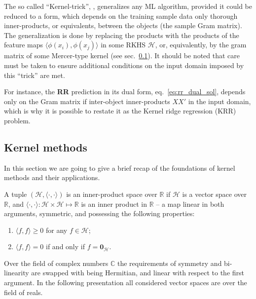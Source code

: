 \documentclass[a4paper,14pt]{extarticle}
\newcommand{\Hcal}{\mathcal{H}}
\newcommand{\Real}{\mathbb{R}}
\newcommand{\nil}{\mathbf{0}}
\newcommand{\Cplx}{\mathbb{C}}
\begin{document}
The so called ``Kernel-trick'', \cite{scholkopf2002}, generalizes any ML algorithm,
provided it could be reduced to a form, which depends on the training sample data
only thorough inner-products, or equivalents, between the objects (the sample Gram
matrix). The generalization is done by replacing the products with the products of
the feature maps $\langle\phi(x_i),\phi(x_j)\rangle$ in some RKHS $\Hcal$, or, equivalently,
by the gram matrix of some Mercer-type kernel (see sec.~\ref{sub:kernel_methods}).
It should be noted that care must be taken to ensure additional conditions on the
input domain imposed by this ``trick'' are met.

For instance, the \textbf{RR} prediction in its dual form, eq.~\ref{eq:rr_dual_sol},
depends only on the Gram matrix if inter-object inner-products $X X'$ in the input
domain, which is why it is possible to restate it as the Kernel ridge regression (KRR)
problem.

\subsection{Kernel methods} %
\label{sub:kernel_methods}

In this section we are going to give a brief recap of the foundations of kernel methods
and their applications.

A tuple $(\Hcal, \langle\cdot, \cdot\rangle)$ is an inner-product space over $\Real$
if $\Hcal$ is a vector space over $\Real$, and $\langle\cdot, \cdot\rangle : \Hcal
\times \Hcal \mapsto \Real$ is an inner product in $\Real$ -- a map linear in both
arguments, symmetric, and possessing the following properties:
\begin{enumerate}
  \item $\langle f, f\rangle\geq 0$ for any $f\in \Hcal$;
  \item $\langle f, f\rangle = 0$ if and only if $f = \nil_\Hcal$.
\end{enumerate}
Over the field of complex numbers $\Cplx$ the requirements of symmetry and bi-
linearity are swapped with being Hermitian, and linear with respect to the first
argument. In the following presentation all considered vector spaces are over the
field of reals.
\end{document}
